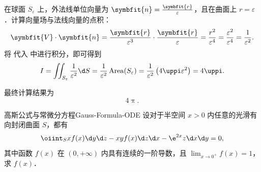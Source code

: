 \begin{solution}
    在球面 $S_\varepsilon$ 上，外法线单位向量为 $\symbfit{n} = \frac{\symbfit{r}}{\varepsilon}$，且在曲面上 $r = \varepsilon$．计算向量场与法线向量的点积：
    \begin{equation}
        \label{eq:integrand-eval}
        \symbfit{V} \cdot \symbfit{n} = \frac{\symbfit{r}}{\varepsilon^3} \cdot \frac{\symbfit{r}}{\varepsilon} = \frac{r^2}{\varepsilon^4} = \frac{\varepsilon^2}{\varepsilon^4} = \frac{1}{\varepsilon^2}.
    \end{equation}
    将  代入  中进行积分，即可得到
    \begin{equation}
        \label{eq:final-eval}
        I = \iint_{S_\varepsilon} \frac{1}{\varepsilon^2} \d S = \frac{1}{\varepsilon^2} \operatorname{Area}(S_\varepsilon) = \frac{1}{\varepsilon^2} \left(4\uppi \varepsilon^2\right) = 4\uppi.
    \end{equation}

    最终计算结果为
    \begin{equation}
        \label{eq:result}
        \boxed{4\uppi}.
    \end{equation}
\end{solution}

\begin{problem}{高斯公式与常微分方程}{Gauss-Formula-ODE}
    设对于半空间 $x > 0$ 内任意的光滑有向封闭曲面 $S$，都有
    \begin{equation}
        \label{eq:surface-integral}
        \oiint_S x f(x) \d y \d z - x y f(x) \d z \d x - \e^{2x} z \d x \d y = 0,
    \end{equation}
    其中函数 $f(x)$ 在 $(0, +\infty)$ 内具有连续的一阶导数，且 $\lim_{x \to 0^+} f(x) = 1$，求 $f(x)$．
\end{problem}

